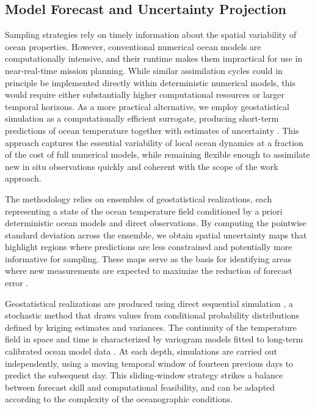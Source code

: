 \subsection{Model Forecast and Uncertainty Projection}

Sampling strategies rely on timely information about the spatial
variability of ocean properties. However, conventional numerical ocean
models are computationally intensive, and their runtime makes them
impractical for use in near-real-time mission planning. While similar
assimilation cycles could in principle be implemented directly within
deterministic numerical models, this would require either substantially
higher computational resources or larger temporal horizons. As a more
practical alternative, we employ geostatistical simulation as a
computationally efficient surrogate, producing short-term predictions of
ocean temperature together with estimates of uncertainty
\cite{deutsch1992}. This approach captures the essential variability of
local ocean dynamics at a fraction of the cost of full numerical models,
while remaining flexible enough to assimilate new in situ observations
quickly \cite{Duarte2025} and coherent with the scope of the work
approach.

The methodology relies on ensembles of geostatistical realizations, each
representing a state of the ocean temperature field conditioned by a
priori deterministic ocean models \cite{CMEMS2017} and direct
observations. By computing the pointwise standard deviation across the
ensemble, we obtain spatial uncertainty maps that highlight regions
where predictions are less constrained and potentially more informative
for sampling. These maps serve as the basis for identifying areas where
new measurements are expected to maximize the reduction of forecast
error \cite{Duarte2025}.

Geostatistical realizations are produced using direct sequential
simulation \cite{soares2001direct}, a stochastic method that draws
values from conditional probability distributions defined by kriging
estimates and variances. The continuity of the temperature field in
space and time is characterized by variogram models fitted to long-term
calibrated ocean model data \cite{CMEMS2017}. At each depth, simulations
are carried out independently, using a moving temporal window of
fourteen previous days to predict the subsequent day. This
sliding-window strategy strikes a balance between forecast skill and
computational feasibility, and can be adapted according to the
complexity of the oceanographic conditions.

